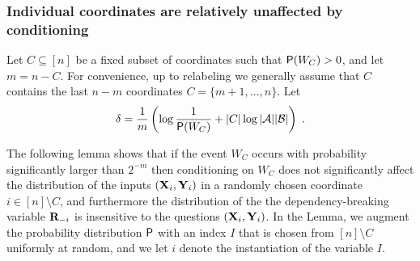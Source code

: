 \subsubsection{Individual coordinates are relatively unaffected by conditioning} 

Let $C\subseteq [n]$ be a fixed subset of coordinates such that $\P(W_C) > 0$, and let $m=n-C$. For convenience, up to relabeling we generally assume that $C$ contains the last $n-m$ coordinates $C=\{m+1,\ldots,n\}$. Let
\begin{equation}
\label{eq:delta}
	\delta = \frac{1}{m} \left ( \log \frac{1}{\P(W_C)} + |C| \log |\A| |\B| \right)\;.
\end{equation}

 
The following lemma shows that if the event $W_C$ occurs with probability significantly larger than $2^{-m}$ then conditioning on $W_C$ does not significantly affect the distribution of the inputs $(\bX_i, \bY_i)$ in a randomly chosen coordinate $i \in [n] \setminus C$, and furthermore the distribution of the the dependency-breaking variable $\bR_\mi$ is insensitive to the questions $(\bX_i,\bY_i)$. In the Lemma, we augment the probability distribution $\P$ with an index $I$ that is chosen from $[n] \setminus C$ uniformly at random, and we let $i$ denote the instantiation of the variable $I$.

